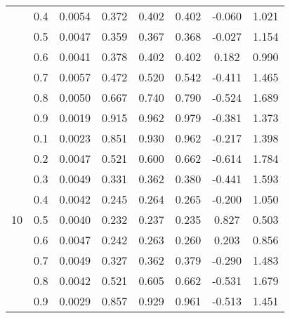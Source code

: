 \documentclass[11pt,a4paper]{report}
\begin{document}
\begin{longtable}{ | c | c || c | c | c | c | c | c | }
 & 0.4 & 0.0054 & 0.372 & 0.402 & 0.402 & -0.060 & 1.021 \\
 & 0.5 & 0.0047 & 0.359 & 0.367 & 0.368 & -0.027 & 1.154 \\
 & 0.6 & 0.0041 & 0.378 & 0.402 & 0.402 & 0.182 & 0.990 \\
 & 0.7 & 0.0057 & 0.472 & 0.520 & 0.542 & -0.411 & 1.465 \\
 & 0.8 & 0.0050 & 0.667 & 0.740 & 0.790 & -0.524 & 1.689 \\
 & 0.9 & 0.0019 & 0.915 & 0.962 & 0.979 & -0.381 & 1.373 \\
 \hline
\multirow{9}{*}{10} & 0.1 & 0.0023 & 0.851 & 0.930 & 0.962 & -0.217 & 1.398 \\
 & 0.2 & 0.0047 & 0.521 & 0.600 & 0.662 & -0.614 & 1.784 \\
 & 0.3 & 0.0049 & 0.331 & 0.362 & 0.380 & -0.441 & 1.593 \\
 & 0.4 & 0.0042 & 0.245 & 0.264 & 0.265 & -0.200 & 1.050 \\
 & 0.5 & 0.0040 & 0.232 & 0.237 & 0.235 & 0.827 & 0.503 \\
 & 0.6 & 0.0047 & 0.242 & 0.263 & 0.260 & 0.203 & 0.856 \\
 & 0.7 & 0.0049 & 0.327 & 0.362 & 0.379 & -0.290 & 1.483 \\
 & 0.8 & 0.0042 & 0.521 & 0.605 & 0.662 & -0.531 & 1.679 \\
 & 0.9 & 0.0029 & 0.857 & 0.929 & 0.961 & -0.513 & 1.451 \\
 \hline
\hline
\end{longtable}
\end{document}
